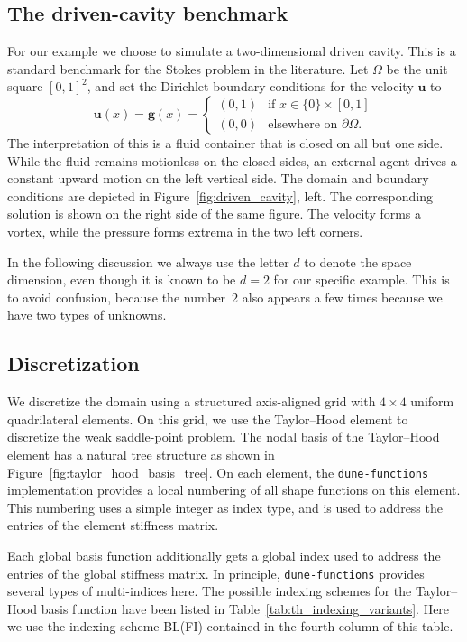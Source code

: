 \documentclass[a4paper,10pt,headings=normal,bibliography=totoc]{scrartcl}
\newcommand{\dunemodule}[1]{\texttt{#1}}
\begin{document}
\subsection{The driven-cavity benchmark}

For our example we choose to simulate a two-dimensional driven cavity.  This is a standard benchmark
for the Stokes problem in the literature.  Let $\Omega$ be the unit square $[0,1]^2$, and set the Dirichlet
boundary conditions for the velocity $\mathbf{u}$ to
\begin{equation*}
 \mathbf{u}(x)
 =\mathbf{g}(x)
 =
 \begin{cases}
  (0,1) & \text{if $x \in \{0\} \times [0,1]$} \\
  (0,0) & \text{elsewhere on $\partial \Omega$}.
 \end{cases}
\end{equation*}
The interpretation of this is a fluid container that is closed on all but one side.  While the fluid remains
motionless on the closed sides, an external agent drives a constant upward motion on the left vertical side.
The domain and boundary conditions are depicted in Figure~\ref{fig:driven_cavity}, left.
The corresponding solution is shown on the right side of the same figure.  The velocity forms a vortex,
while the pressure forms extrema in the two left corners.

In the following discussion we always use the letter $d$ to denote the space dimension, even though it is
known to be $d=2$ for our specific example.  This is to avoid confusion, because the number~2 also
appears a few times because we have two types of unknowns.

\subsection{Discretization}

We discretize the domain using a structured axis-aligned grid with $4 \times 4$ uniform quadrilateral elements.
On this grid, we use the Taylor--Hood element to discretize the weak saddle-point problem.  The nodal basis
of the Taylor--Hood element has a natural tree structure as shown in Figure~\ref{fig:taylor_hood_basis_tree}.
On each element, the \dunemodule{dune-functions} implementation provides a local numbering of all shape functions
on this element.  This numbering uses a simple integer as index type, and is used to address the entries of the
element stiffness matrix.

Each global basis function additionally gets a global index used to address the entries of the global stiffness
matrix.  In principle, \dunemodule{dune-functions} provides several types of multi-indices here.
The possible indexing schemes for the Taylor--Hood basis function have been listed in
Table~\ref{tab:th_indexing_variants}.
Here we use the indexing scheme BL(FI) contained in the fourth column of this table.
\end{document}

